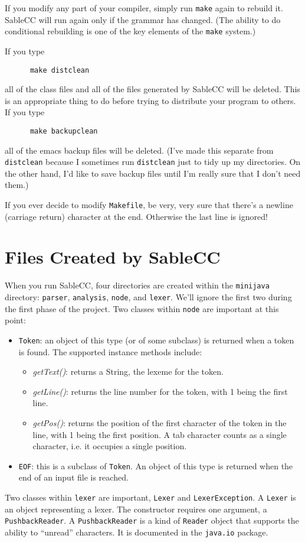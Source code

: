\documentclass[11pt]{article}
\begin{document}
If you modify any part of your compiler, simply run {\tt make} again to rebuild it.  SableCC will run again only if the grammar has changed.  (The ability to do conditional rebuilding is one of the key elements of the {\tt make} system.)

If you type
\begin{verbatim}
      make distclean
\end{verbatim}
all of the class files and all of the files generated by SableCC will be deleted.  This is an appropriate thing to do before trying to distribute your program to others.  If you type
\begin{verbatim}
      make backupclean
\end{verbatim}
all of the emacs backup files will be deleted.  (I've made this separate from {\tt distclean} because I sometimes run {\tt distclean} just to tidy up my directories.  On the other hand, I'd like to save backup files until I'm really sure that I don't need them.)

If you ever decide to modify {\tt Makefile}, be very, very sure that there's a newline (carriage return) character at the end.  Otherwise the last line is ignored!

\section{Files Created by SableCC}
When you run SableCC, four directories are created within the {\tt minijava} directory:  {\tt parser}, {\tt analysis}, {\tt node}, and {\tt lexer}.  We'll ignore the first two during the first phase of the project.  Two classes within {\tt node} are important at this point:
\begin{itemize}
\item{\tt Token}: an object of this type (or of some subclass) is returned when a token is found.  The supported instance methods include:
\begin{itemize}
\item{\em getText()}: returns a String, the lexeme for the token.
\item{\em getLine()}: returns the line number for the token, with 1 being the first line.
\item{\em getPos()}: returns the position of the first character of the token in the line, with 1 being the first position.  A tab character counts as a single character, i.e. it occupies a single position.
\end{itemize}
\item{\tt EOF}: this is a subclass of {\tt Token}.  An object of this type is returned when the end of an input file is reached.
\end{itemize}
Two classes within {\tt lexer} are important, {\tt Lexer} and {\tt LexerException}.  A {\tt Lexer} is
an object representing a lexer.  The constructor requires one argument, a {\tt PushbackReader}.  A {\tt PushbackReader} is a kind of {\tt Reader} object
that supports the ability to ``unread'' characters.  It is
documented in the {\tt java.io} package.
\end{document}
